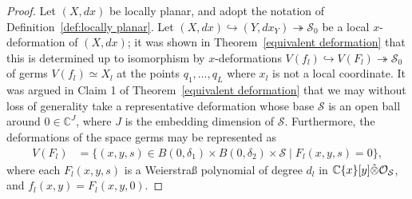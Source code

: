 \documentclass[11pt,twoside]{amsart}
\theoremstyle{plain}
\newcommand{\Sm}{\mathcal{S}}
\newcommand{\Sh}[1]{\mathcal{#1}} %
\newcommand{\dfx}{dx}
\begin{document}
\begin{proof}
Let $ (X, d x) $ be locally planar, and adopt the notation of Definition~\ref{def:locally planar}.
Let $(X,\dfx)\hookrightarrow(Y, d x_Y)\twoheadrightarrow\mathcal S_0 $
be a local $ x $-deformation of  $ (X, \dfx) $; it was shown in Theorem~\ref{equivalent deformation} that this
is
determined up to isomorphism by $x$-deformations
 $ V (f_l)\hookrightarrow V (F_l)\twoheadrightarrow\Sm_0 $
of germs $ V (f_l)\simeq X_l $ at the points $q_1,\ldots,q_L$ where $x_l$ is not a local coordinate. %
It was argued in Claim 1 of Theorem~\ref{equivalent deformation} that we may without loss of generality take a representative deformation whose base $\mathcal S $ is an open ball around $ 0\in\mathbb C ^ J $, where $J$ is the embedding dimension of $\mathcal S$.
%
Furthermore, the deformations of the space germs may be represented as
\begin{align*} %
V (F_l) &=\{(x,y,s)\in B(0,\delta_1)\times B(0,\delta_2)\times\Sm\mid F_l(x,y,s)=0\},
\end{align*}
where each $F_l(x,y,s)$ is  a Weierstra{\ss} polynomial of degree $ d_l $  in $\mathbb{C}\{x\}[y]\Hat{\otimes}\Sh{O}_{\Sm}$, and $f_l(x,y) = F_l(x,y,0)$.



\end{proof}
\end{document}
